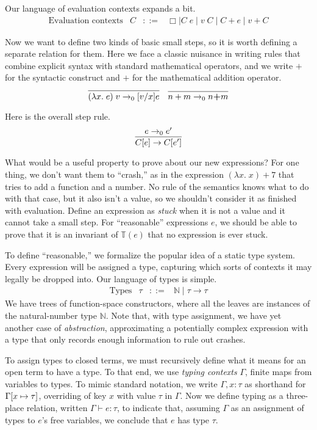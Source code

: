 \documentclass{amsbook}
\theoremstyle{definition}
\theoremstyle{remark}
\numberwithin{section}{chapter}
\numberwithin{equation}{chapter}
\begin{document}
Our language of evaluation contexts expands a bit.
$$\begin{array}{rrcl}
  \textrm{Evaluation contexts} & C &::=& \Box \mid C \; e \mid v \; C \mid C + e \mid v + C
\end{array}$$

Now we want to define two kinds of basic small steps, so it is worth defining a separate relation for them.
Here we face a classic nuisance in writing rules that combine explicit syntax with standard mathematical operators, and we write $+$ for the syntactic construct and $\textbf{+}$ for the mathematical addition operator.
$$\infer{\smallstepo{(\lambda x. \; e) \; v}{\subst{e}{x}{v}}}{}
\quad \infer{\smallstepo{n + m}{n \textbf{+} m}}{}$$

Here is the overall step rule.
$$\infer{\smallstep{\plug{C}{e}}{\plug{C}{e'}}}{
  \smallstepo{e}{e'}
}$$

What would be a useful property to prove about our new expressions?
For one thing, we don't want them to ``crash,'' as in the expression $(\lambda x. \; x) + 7$ that tries to add a function and a number.
No rule of the semantics knows what to do with that case, but it also isn't a value, so we shouldn't consider it as finished with evaluation.
Define an expression as \emph{stuck} when it is not a value and it cannot take a small step.
For ``reasonable'' expressions $e$, we should be able to prove that it is an invariant of $\mathbb T(e)$ that no expression is ever stuck.

To define ``reasonable,'' we formalize the popular idea of a static type system.
Every expression will be assigned a type, capturing which sorts of contexts it may legally be dropped into.
Our language of types is simple.
\abstraction
$$\begin{array}{rrcl}
  \textrm{Types} & \tau &::=& \mathbb N \mid \tau \to \tau
\end{array}$$
We have trees of function-space constructors, where all the leaves are instances of the natural-number type $\mathbb N$.
Note that, with type assignment, we have yet another case of \emph{abstraction}, approximating a potentially complex expression with a type that only records enough information to rule out crashes.

\newcommand{\hasty}[3]{#1 \vdash #2 : #3}

To assign types to closed terms, we must recursively define what it means for an open term to have a type.
To that end, we use \emph{typing contexts} $\Gamma$, finite maps from variables to types.
To mimic standard notation, we write $\Gamma, x : \tau$ as shorthand for $\Gamma[x \mapsto \tau]$, overriding of key $x$ with value $\tau$ in $\Gamma$.
Now we define typing as a three-place relation, written $\hasty{\Gamma}{e}{\tau}$, to indicate that, assuming $\Gamma$ as an assignment of types to $e$'s free variables, we conclude that $e$ has type $\tau$.
\end{document}
